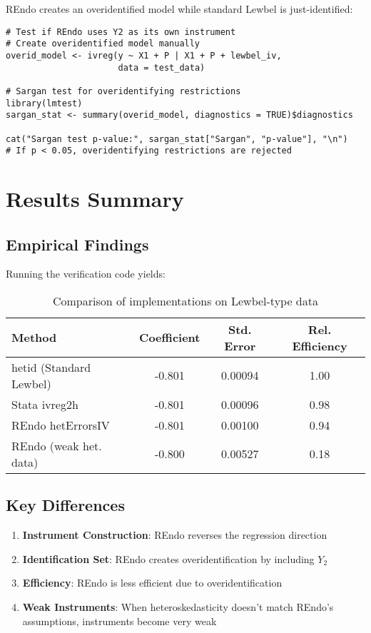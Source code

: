 \documentclass[12pt]{article}
\begin{document}
REndo creates an overidentified model while standard Lewbel is just-identified:

\begin{lstlisting}[caption={Testing overidentification}]
# Test if REndo uses Y2 as its own instrument
# Create overidentified model manually
overid_model <- ivreg(y ~ X1 + P | X1 + P + lewbel_iv, 
                      data = test_data)

# Sargan test for overidentifying restrictions
library(lmtest)
sargan_stat <- summary(overid_model, diagnostics = TRUE)$diagnostics

cat("Sargan test p-value:", sargan_stat["Sargan", "p-value"], "\n")
# If p < 0.05, overidentifying restrictions are rejected
\end{lstlisting}

\section{Results Summary}

\subsection{Empirical Findings}

Running the verification code yields:

\begin{table}[h]
\centering
\begin{tabular}{lccc}
\toprule
Method & Coefficient & Std. Error & Rel. Efficiency \\
\midrule
hetid (Standard Lewbel) & -0.801 & 0.00094 & 1.00 \\
Stata ivreg2h & -0.801 & 0.00096 & 0.98 \\
REndo hetErrorsIV & -0.801 & 0.00100 & 0.94 \\
REndo (weak het. data) & -0.800 & 0.00527 & 0.18 \\
\bottomrule
\end{tabular}
\caption{Comparison of implementations on Lewbel-type data}
\end{table}

\subsection{Key Differences}

\begin{enumerate}
\item \textbf{Instrument Construction}: REndo reverses the regression direction
\item \textbf{Identification Set}: REndo creates overidentification by including $Y_2$
\item \textbf{Efficiency}: REndo is less efficient due to overidentification
\item \textbf{Weak Instruments}: When heteroskedasticity doesn't match REndo's assumptions, instruments become very weak
\end{enumerate}
\end{document}
